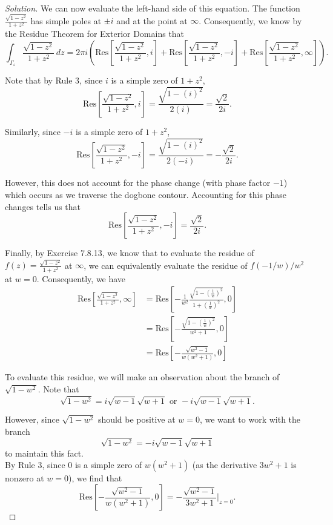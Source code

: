 \documentclass[11pt]{article}
\newenvironment{solution}
  {\renewcommand\qedsymbol{$\blacksquare$}\begin{proof}[Solution]}
  {\end{proof}}
\theoremstyle{definition}
\begin{document}
\begin{solution}
We can now evaluate the left-hand side of this equation. The function $\frac{\sqrt{1-z^2}}{1+z^2}$ has simple poles at $\pm i$ and at the point at $\infty$. Consequently, we know by the Residue Theorem for Exterior Domains that
\[ \int_{\Gamma_\varepsilon} \frac{\sqrt{1-z^2}}{1+z^2} \, dz = 2\pi i \left( \mathrm{Res}\left[\frac{\sqrt{1-z^2}}{1+z^2}, i\right]
+ \mathrm{Res}\left[ \frac{\sqrt{1-z^2}}{1+z^2}, -i \right] + \mathrm{Res}\left[ \frac{\sqrt{1-z^2}}{1+z^2}, \infty \right]  \right).\]

Note that by Rule 3, since $i$ is a simple zero of $1+z^2$, 
\[ \mathrm{Res}\left[\frac{\sqrt{1-z^2}}{1+z^2}, i\right] = \frac{\sqrt{1-(i)^2}}{2(i)} = \frac{\sqrt{2}}{2i}.\]

Similarly, since $-i$ is a simple zero of $1+z^2$, 
\[ \mathrm{Res}\left[ \frac{\sqrt{1-z^2}}{1+z^2}, -i \right] = \frac{\sqrt{1-(i)^2}}{2(-i)} = -\frac{\sqrt{2}}{2i}.\]

However,  this does not account for the phase change (with phase factor $-1$) which occurs as we traverse the dogbone contour. 
Accounting for this phase changes tells us that
\[ \mathrm{Res}\left[ \frac{\sqrt{1-z^2}}{1+z^2}, -i \right] = \frac{\sqrt{2}}{2i}.\]

Finally, by Exercise 7.8.13, we know that to evaluate the residue of $f(z) = \frac{\sqrt{1-z^2}}{1+z^2}$ at $\infty$, we can equivalently evaluate the residue of $f(-1/w)/w^2$ at $w=0$. Consequently, we have
\begin{align*} \mathrm{Res}\left[ \frac{\sqrt{1-z^2}}{1+z^2}, \infty \right] &= \mathrm{Res}\left[ -\frac{1}{w^2}\frac{\sqrt{1-\left(\frac{1}{w}\right)^2}}{1+\left(\frac{1}{w}\right)^2}, 0 \right] \\
&= \mathrm{Res}\left[-\frac{\sqrt{1-\left(\frac{1}{w}\right)^2}}{w^2+1}, 0 \right] \\
&=  \mathrm{Res}\left[ -\frac{\sqrt{w^2 - 1}}{w(w^2+1)}, 0 \right]
\end{align*}

To evaluate this residue, we will make an observation about the branch of $\sqrt{1-w^2}$. Note that
\[ \sqrt{1-w^2} = i\sqrt{w-1}\sqrt{w+1} \text{ or } -i\sqrt{w-1}\sqrt{w+1}.\]

However, since $\sqrt{1-w^2}$ should be positive at $w=0$, we want to work with the branch 
\[\sqrt{1-w^2}= -i\sqrt{w-1}\sqrt{w+1}\] to maintain this fact. \\

By Rule 3, since $0$ is a simple zero of $w(w^2+1)$ (as the derivative $3w^2 + 1$ is nonzero at $w=0$), we find that
\[ \mathrm{Res}\left[ -\frac{\sqrt{w^2 - 1}}{w(w^2+1)}, 0 \right] = -\frac{\sqrt{w^2 - 1}}{3w^2 + 1} \bigg\rvert_{z=0}.\]


\end{solution}
\end{document}
